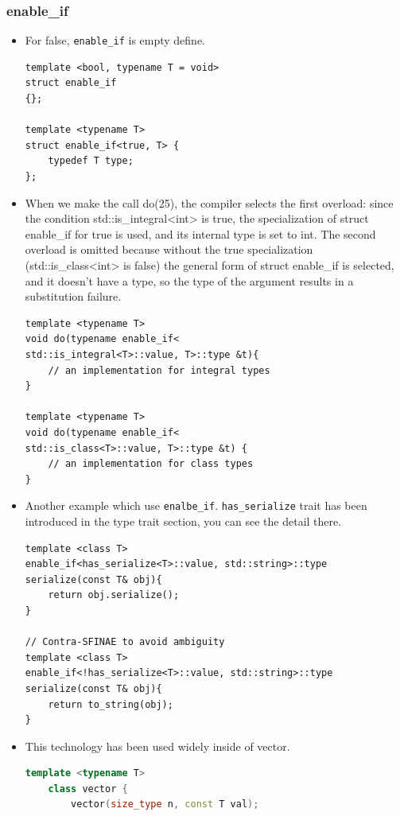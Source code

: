 \documentclass[a4paper,11pt,twoside]{book}
\begin{document}
\subsubsection{enable\_if}
\begin{itemize}
	
	\item For false, \texttt{enable\_if} is empty define.
\begin{lstlisting}[numbers=none]
template <bool, typename T = void>
struct enable_if
{};

template <typename T>
struct enable_if<true, T> {
	typedef T type;
};	
\end{lstlisting}	

\item When we make the call do(25), the compiler selects the first overload: since the condition std::is\_integral<int> is true, the specialization of struct enable\_if for true is used, and its internal type is set to int. The second overload is omitted because without the true specialization (std::is\_class<int> is false) the general form of struct enable\_if is selected, and it doesn't have a type, so the type of the argument results in a substitution failure.

\begin{lstlisting}[numbers=none]
template <typename T>
void do(typename enable_if<
std::is_integral<T>::value, T>::type &t){
	// an implementation for integral types 
}

template <typename T>
void do(typename enable_if<
std::is_class<T>::value, T>::type &t) {
	// an implementation for class types
}		
\end{lstlisting}	
	
	\item Another example which use \texttt{enalbe\_if}. \texttt{has\_serialize} trait has been introduced in the type trait section, you can see the detail there. 
	
\begin{lstlisting}[numbers=none]
template <class T>
enable_if<has_serialize<T>::value, std::string>::type
serialize(const T& obj){
	return obj.serialize();
}

// Contra-SFINAE to avoid ambiguity
template <class T>
enable_if<!has_serialize<T>::value, std::string>::type 
serialize(const T& obj){
	return to_string(obj);
}	
\end{lstlisting}	
	
	
	
	\item This technology has been used widely inside of vector.
\begin{lstlisting}[frame=single, language=c++]
	template <typename T>
	class vector {
		vector(size_type n, const T val);
		

\end{lstlisting}
\end{itemize}
\end{document}
